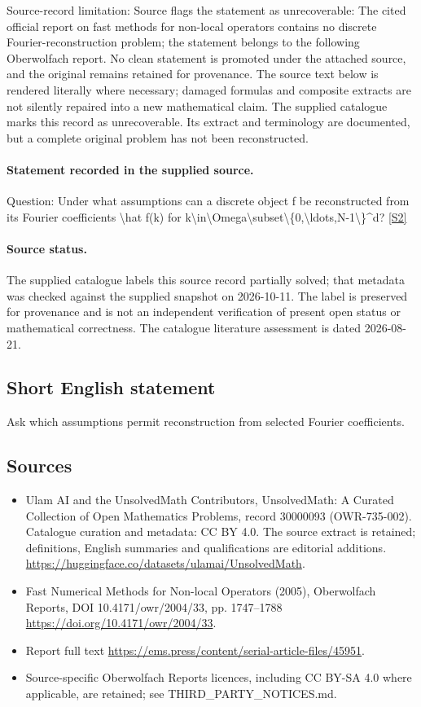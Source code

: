 \documentclass[11pt]{article}
\begin{document}
Source-record limitation: Source flags the statement as unrecoverable: The cited official report on fast methods for non-local operators contains no discrete Fourier-reconstruction problem; the statement belongs to the following Oberwolfach report. No clean statement is promoted under the attached source, and the original remains retained for provenance.
The source text below is rendered literally where necessary; damaged formulas and composite extracts are not silently repaired into a new mathematical claim.
The supplied catalogue marks this record as unrecoverable. Its extract and terminology are documented, but a complete original problem has not been reconstructed.
\paragraph{Statement recorded in the supplied source.}
Question: Under what assumptions can a discrete object f be reconstructed from its Fourier coefficients \textbackslash{}hat f(k) for k\textbackslash{}in\textbackslash{}Omega\textbackslash{}subset\textbackslash{}\{0,\textbackslash{}ldots,N-1\textbackslash{}\}\textasciicircum{}d? \href{https://doi.org/10.4171/owr/2004/33}{[S2]}
\paragraph{Source status.}
The supplied catalogue labels this source record partially solved; that metadata was checked against the supplied snapshot on 2026-10-11. The label is preserved for provenance and is not an independent verification of present open status or mathematical correctness. The catalogue literature assessment is dated 2026-08-21.
\subsection{Short English statement}
Ask which assumptions permit reconstruction from selected Fourier coefficients.
\subsection{Sources}
\begin{itemize}
\item[S1] Ulam AI and the UnsolvedMath Contributors, UnsolvedMath: A Curated Collection of Open Mathematics Problems, record 30000093 (OWR-735-002). Catalogue curation and metadata: CC BY 4.0. The source extract is retained; definitions, English summaries and qualifications are editorial additions.
\url{https://huggingface.co/datasets/ulamai/UnsolvedMath}.
\item[S2] Fast Numerical Methods for Non-local Operators (2005), Oberwolfach Reports, DOI 10.4171/owr/2004/33, pp. 1747--1788
\url{https://doi.org/10.4171/owr/2004/33}.
\item[S3] Report full text
\url{https://ems.press/content/serial-article-files/45951}.
\item Source-specific Oberwolfach Reports licences, including CC BY-SA 4.0 where applicable, are retained; see THIRD\_PARTY\_NOTICES.md.
\end{itemize}
\end{document}
